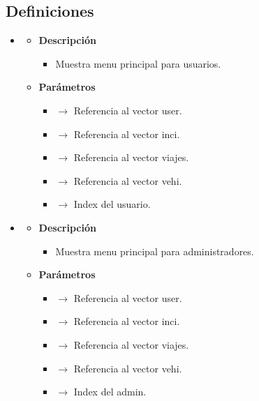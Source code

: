 \subsection{Definiciones}
\begin{itemize}
     \item {}
    \begin{itemize}
        \item \textbf{Descripción}
        \begin{itemize}
			\item Muestra menu principal para usuarios.
		\end{itemize}
		\item \textbf{Parámetros}
		\begin{itemize}
			\item {} $\rightarrow$ Referencia al vector user.
			\item {} $\rightarrow$ Referencia al vector inci.
			\item {} $\rightarrow$ Referencia al vector viajes.
			\item {} $\rightarrow$ Referencia al vector vehi.
			\item {} $\rightarrow$ Index del usuario.
		\end{itemize}
	\end{itemize}
    \item {}
    \begin{itemize}
        \item \textbf{Descripción}
        \begin{itemize}
			\item Muestra menu principal para administradores.
		\end{itemize}
		\item \textbf{Parámetros}
		\begin{itemize}
			\item {} $\rightarrow$ Referencia al vector user.
			\item {} $\rightarrow$ Referencia al vector inci.
			\item {} $\rightarrow$ Referencia al vector viajes.
			\item {} $\rightarrow$ Referencia al vector vehi.
			\item {} $\rightarrow$ Index del admin.
		\end{itemize}
	\end{itemize}
\end{itemize}
\newpage
